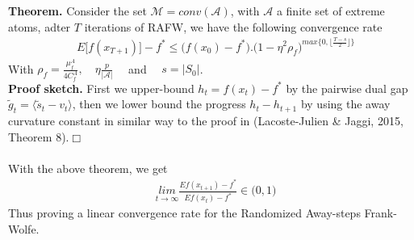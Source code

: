 \textbf{Theorem.} Consider the set $\mathcal{M}=conv(\mathcal{A})$, with
$\mathcal{A}$ a finite set of extreme atoms, adter $T$ iterations of RAFW, we
have the following convergence rate
\begin{equation*}
\begin{aligned}
    &E\big[f(x_{T+1})\big]- f^{*}\leq \Big(f(x_{0})- f^{*}\Big).\Big(1- \eta^{2}\rho_{f}\Big)^{\textit{max}\{0,\lfloor\frac{T-s}{2}\rfloor\}}
\end{aligned}
\end{equation*}
With $\rho_{f}=
\frac{\mu^{A}_{f}}{4C^{A}_{f}},\quad\eta\frac{p}{|\mathcal{A}|}\quad$ and
$\quad s=|S_{0}|$.\\

\textbf{Proof sketch.} First we upper-bound $h_{t}=f(x_{t})- f^{*}$ by the
pairwise dual gap $\tilde{g}_{t}=\langle \tilde{s}_{t}- v_{t}\rangle$, then we
lower bound the progress $h_{t}- h_{t+1}$ by using the away curvature constant
in similar way to the proof in (Lacoste-Julien \& Jaggi, 2015, Theorem
8).$\Box$\\ \\
With the above theorem, we get
\begin{equation*}
\begin{aligned}
    &\underset{t\rightarrow \infty}{\textit{lim}} \frac{E f(x_{t+1})- f^{*}}{E f(x_{t})- f^{*}} \in \big(0,1\big)
\end{aligned}
\end{equation*}
Thus proving a linear convergence rate for the Randomized Away-steps Frank-Wolfe.
